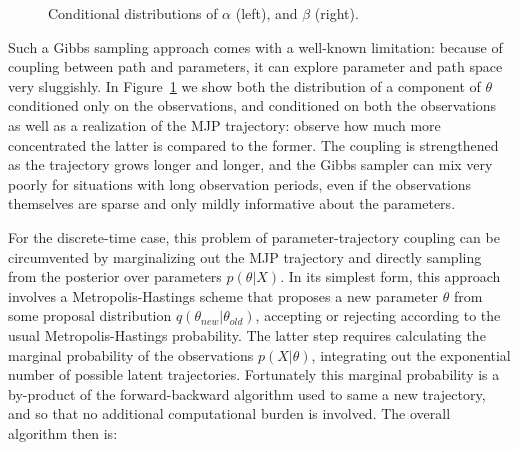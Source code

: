 \begin{figure}
\begin{minipage}[!hp]{0.4\linewidth}
    \vspace{-0 in}
  \end{minipage}
  \caption{Conditional distributions of $\alpha$ (left), and $\beta$ (right).}
     \label{fig:hist}
  \end{figure}
  

Such a Gibbs sampling approach comes with a well-known limitation:
because of coupling between path and parameters, it can explore parameter 
and path space very sluggishly. In Figure~\ref{fig:hist} 
we show
both the distribution of a component of $\theta$ conditioned
only on the observations, and conditioned on both the observations 
as well as a realization of the MJP trajectory: observe how much
more concentrated the latter is compared to the former. The
coupling is strengthened as the trajectory grows longer and longer, and
the Gibbs sampler can mix very poorly for situations with
long observation periods, even if the observations themselves are
sparse and only mildly informative about the parameters.

For the discrete-time case, this problem of parameter-trajectory
coupling can be circumvented by marginalizing out the MJP trajectory 
and directly sampling from the posterior over parameters $p(\theta|X)$.
In its simplest form, this approach involves a Metropolis-Hastings
scheme that proposes a new parameter $\theta$ from some proposal distribution 
$q(\theta_{new}|\theta_{old})$, accepting or rejecting according to the usual
Metropolis-Hastings probability. The latter step requires calculating the 
marginal probability of the observations $p(X|\theta)$, integrating out
the exponential number of possible latent trajectories. Fortunately
this marginal probability is a by-product of the forward-backward
algorithm used to same a new trajectory, and so that no 
additional computational burden is involved. The overall algorithm then is:

